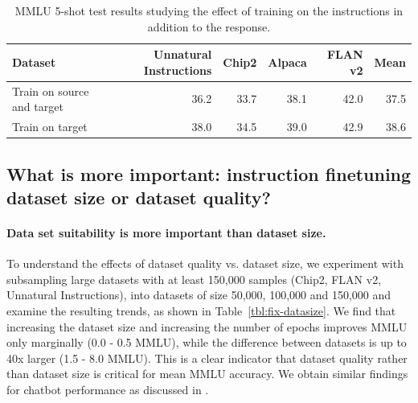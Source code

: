 \documentclass{article}
\begin{document}
\begin{table}[]
    \centering
    \begin{tabular}{lrrrrr}
    \toprule
        Dataset &                   Unnatural Instructions & Chip2 & Alpaca & FLAN v2 & Mean \\
        \midrule
        Train on source and target & 36.2                  & 33.7  & 38.1   & 42.0 & 37.5\\
        Train on target            & 38.0                  & 34.5  & 39.0   & 42.9 & 38.6\\
    \bottomrule
    \end{tabular}
    \caption{MMLU 5-shot test results studying the effect of training on the instructions in addition to the response.}
    \label{tab:response}
\end{table}

\subsection{What is more important: instruction finetuning dataset size or dataset quality?}
\paragraph{Data set suitability is more important than dataset size.} To understand the effects of dataset quality vs. dataset size, we experiment with subsampling large datasets with at least 150,000 samples (Chip2, FLAN v2, Unnatural Instructions), into datasets of size 50,000, 100,000 and 150,000 and examine the resulting trends, as shown in Table~\ref{tbl:fix-datasize}. We find that increasing the dataset size and increasing the number of epochs improves MMLU only marginally (0.0 - 0.5 MMLU), while the difference between datasets is up to 40x larger (1.5 - 8.0 MMLU). This is a clear indicator that dataset quality rather than dataset size is critical for mean MMLU accuracy. We obtain similar findings for chatbot performance as discussed in .
\end{document}
